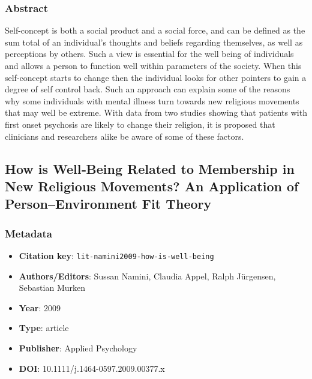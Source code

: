 \subsubsection*{Abstract}
Self-concept is both a social product and a social force, and can be defined as the sum total of an individual's thoughts and beliefs regarding themselves, as well as perceptions by others. Such a view is essential for the well being of individuals and allows a person to function well within parameters of the society. When this self-concept starts to change then the individual looks for other pointers to gain a degree of self control back. Such an approach can explain some of the reasons why some individuals with mental illness turn towards new religious movements that may well be extreme. With data from two studies showing that patients with first onset psychosis are likely to change their religion, it is proposed that clinicians and researchers alike be aware of some of these factors.

\subsection{How is Well‐Being Related to Membership in New Religious Movements? An Application of Person–Environment Fit Theory}\label{lit:lit-namini2009-how-is-well-being}
\subsubsection*{Metadata}
\begin{itemize}
  \item \textbf{Citation key}: \texttt{lit-namini2009-how-is-well-being}
  \item \textbf{Authors/Editors}: Sussan Namini, Claudia Appel, Ralph Jürgensen, Sebastian Murken
  \item \textbf{Year}: 2009
  \item \textbf{Type}: article
  \item \textbf{Publisher}: Applied Psychology
  \item \textbf{DOI}: 10.1111/j.1464-0597.2009.00377.x
\end{itemize}
